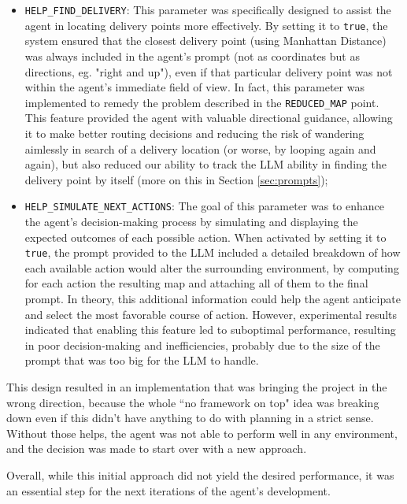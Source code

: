 \begin{itemize}
  \item \texttt{HELP\_FIND\_DELIVERY}: This parameter was specifically designed to
    assist the agent in locating delivery points more effectively. By setting it
    to \texttt{true}, the system ensured that the closest delivery point (using Manhattan
    Distance) was always included in the agent's prompt (not as coordinates but as
    directions, eg. "right and up"), even if that particular delivery point was not
    within the agent's immediate field of view. In fact, this parameter was implemented
    to remedy the problem described in the \texttt{REDUCED\_MAP} point. This feature
    provided the agent with valuable directional guidance, allowing it to make
    better routing decisions and reducing the risk of wandering aimlessly in
    search of a delivery location (or worse, by looping again and again), but
    also reduced our ability to track the LLM ability in finding the delivery
    point by itself (more on this in Section \ref{sec:prompts});

  \item \texttt{HELP\_SIMULATE\_NEXT\_ACTIONS}: The goal of this parameter was to
    enhance the agent's decision-making process by simulating and displaying the
    expected outcomes of each possible action. When activated by setting it to
    \texttt{true}, the prompt provided to the LLM included a detailed breakdown
    of how each available action would alter the surrounding environment, by computing
    for each action the resulting map and attaching all of them to the final prompt.
    In theory, this additional information could help the agent anticipate and select
    the most favorable course of action. However, experimental results indicated
    that enabling this feature led to suboptimal performance, resulting in poor
    decision-making and inefficiencies, probably due to the size of the prompt that
    was too big for the LLM to handle.
\end{itemize}

This design resulted in an implementation that was bringing the project in the wrong
direction, because the whole ``no framework on top" idea was breaking down even if
this didn't have anything to do with planning in a strict sense. Without those
helps, the agent was not able to perform well in any environment, and the
decision was made to start over with a new approach.

Overall, while this initial approach did not yield the desired performance, it
was an essential step for the next iterations of the agent's development.

